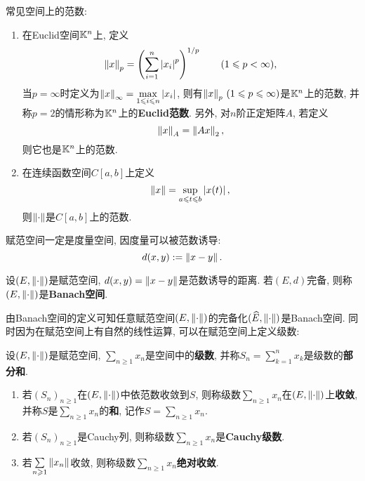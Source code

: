     \begin{Example}
    常见空间上的范数:

    \begin{enumerate}[(1)]
    \item 在Euclid空间$ \mathbb{K}^n $上, 定义
        \[
        \left\| x \right\|_p=\left(\sum_{i=1}^n\left| x_i \right| ^p\right)^{1/p}\qquad(1\leqslant p<\infty),
        \]
        当$ p=\infty $时定义为$ \left\| x \right\|_\infty=\max\limits_{1\leqslant i\leqslant n}\left| x_i \right|  $, 则有$ \left\| x \right\|_p\,(1\leqslant p\leqslant\infty) $是$ \mathbb{K}^n $上的范数, 并称$ p=2 $的情形称为$ \mathbb{K}^n $上的\textbf{Euclid范数}. 另外, 对$ n $阶正定矩阵$ A $, 若定义
        \[
        \left\| x \right\|_A=\left\| Ax \right\|_2,
        \]
        则它也是$ \mathbb{K}^n $上的范数.

    \item 在连续函数空间$ C[a,b] $上定义
    \[
    \left\| x \right\|=\sup_{a\leqslant t\leqslant b}\left| x(t) \right| ,
    \]
    则$ \left\| \cdot \right\| $是$ C[a,b] $上的范数.
    \end{enumerate}

    \end{Example}

    \begin{Remark}
    赋范空间一定是度量空间, 因度量可以被范数诱导:
    \[
    d(x,y):=\left\| x-y \right\|.
    \]
    \end{Remark}

    \begin{Definition}[Banach空间]\label{def:Banach空间}
    设$ (E,\left\| \cdot \right\|) $是赋范空间, $ d(x,y)=\left\| x-y \right\| $是范数诱导的距离. 若$ (E,d) $完备, 则称$ (E,\left\| \cdot \right\|) $是\textbf{Banach空间}.
    \end{Definition}

    由Banach空间的定义可知任意赋范空间$ (E,\left\| \cdot \right\|) $的完备化$ (\widehat{E},\left\| \cdot \right\|) $是Banach空间. 同时因为在赋范空间上有自然的线性运算, 可以在赋范空间上定义级数:

    \begin{Definition}[级数]\label{def:级数}
    设$ (E,\left\| \cdot \right\|) $是赋范空间, $ \sum\limits_{n\geqslant 1}x_n $是空间中的\textbf{级数}, 并称$ S_n=\sum\limits_{k=1}^nx_k $是级数的\textbf{部分和}.

    \begin{enumerate}[(1)]
    \item 若$ (S_n)_{n\geqslant 1} $在$ (E,\left\| \cdot \right\|) $中依范数收敛到$ S $, 则称级数$ \sum\limits_{n\geqslant 1}x_n $在$ (E,\left\| \cdot \right\|) $上\textbf{收敛}, 并称$ S $是$ \sum\limits_{n\geqslant 1}x_n $的\textbf{和}, 记作$ S=\sum\limits_{n\geqslant 1}x_n $.

    \item 若$ (S_n)_{n\geqslant 1} $是Cauchy列, 则称级数$ \sum\limits_{n\geqslant 1}x_n $是\textbf{Cauchy级数}.

    \item 若$ \sum\limits_{n\geqslant 1}\left\| x_n \right\| $收敛, 则称级数$ \sum\limits_{n\geqslant 1}x_n $\textbf{绝对收敛}.
    \end{enumerate}
    \end{Definition}

